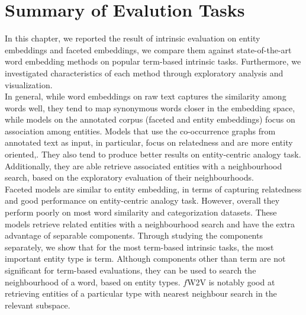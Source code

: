 \section{Summary of Evalution Tasks}\label{sec:eval_summary}
In this chapter, we reported the result of intrinsic evaluation on entity embeddings and faceted embeddings, we compare them against state-of-the-art word embedding methods on popular term-based intrinsic tasks. Furthermore, we investigated characteristics of each method through exploratory analysis and visualization.\\
In general, while word embeddings on raw text captures the similarity among words well, they tend to map synonymous words closer in the embedding space, while models on the annotated corpus (faceted and entity embeddings) focus on association among entities. Models that use the co-occurrence graphs from annotated text as input, in particular, focus on relatedness and are more entity oriented,. They also tend to produce better results on entity-centric analogy task. Additionally, they are able retrieve associated entities with a neighbourhood search, based on the exploratory evaluation of their neighbourhoods. \\
Faceted models are similar to entity embedding, in terms of capturing relatedness and good performance on entity-centric analogy task. However, overall they perform poorly on most word similarity and categorization datasets. These models retrieve related entities with a neighbourhood search and have the extra advantage of separable components. Through studying the components separately, we show that for the most term-based intrinsic tasks, the most important entity type is term. Although components other than term are not significant for term-based evaluations, they can be used to search the neighbourhood of a word, based on entity types. $f$W2V is notably good at retrieving entities of a particular type with nearest neighbour search in the relevant subspace.
%
%
